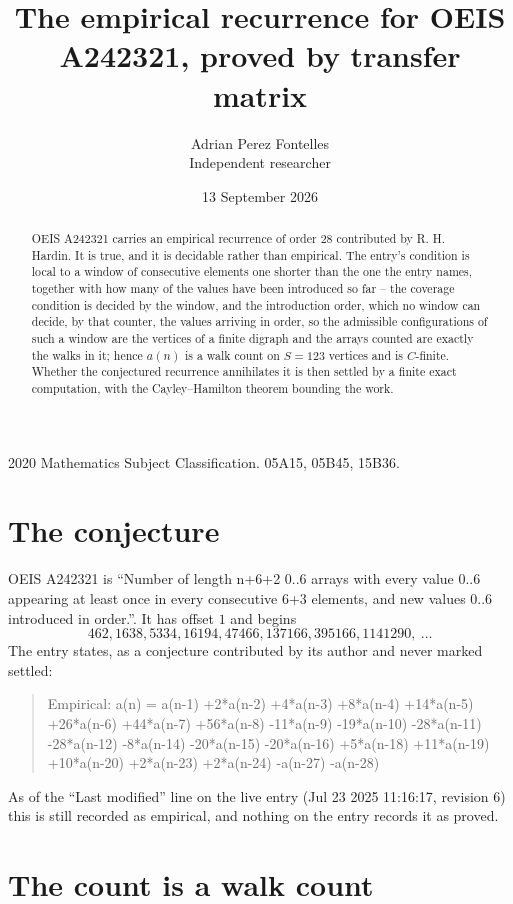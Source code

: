 \documentclass[11pt,a4paper]{article}
\title{The empirical recurrence for OEIS A242321, proved by transfer matrix}
\author{Adrian Perez Fontelles\\ \small Independent researcher}
\date{13 September 2026}
\theoremstyle{plain}
\theoremstyle{definition}
\begin{document}
\maketitle

\begin{abstract}
OEIS A242321 carries an empirical recurrence of order $28$ contributed by R. H. Hardin. It is
true, and it is decidable rather than empirical. The entry's condition is local to a window of consecutive elements one shorter than the one the entry names, together with how many of the values have been introduced so far -- the coverage condition is decided by the window, and the introduction order, which no window can decide, by that counter, the values arriving in order, so
the admissible configurations of such a window are the vertices of a finite digraph and the
arrays counted are exactly the walks in it; hence $a(n)$ is a walk count on $S=123$ vertices
and is $C$-finite. Whether the conjectured recurrence annihilates it is then settled by a
finite exact computation, with the Cayley--Hamilton theorem bounding the work.
\end{abstract}

\noindent\small 2020 Mathematics Subject Classification. 05A15, 05B45, 15B36.\normalsize

\section{The conjecture}

OEIS A242321 is ``Number of length n+6+2 0..6 arrays with every value 0..6 appearing at least once in every consecutive 6+3 elements, and new values 0..6 introduced in order.''. It has offset $1$ and begins
\[
462, 1638, 5334, 16194, 47466, 137166, 395166, 1141290,\ \dots
\]
The entry states, as a conjecture contributed by its author and never marked settled:
\begin{quote}
Empirical: a(n) = a(n-1) +2*a(n-2) +4*a(n-3) +8*a(n-4) +14*a(n-5) +26*a(n-6) +44*a(n-7) +56*a(n-8) -11*a(n-9) -19*a(n-10) -28*a(n-11) -28*a(n-12) -8*a(n-14) -20*a(n-15) -20*a(n-16) +5*a(n-18) +11*a(n-19) +10*a(n-20) +2*a(n-23) +2*a(n-24) -a(n-27) -a(n-28)
\end{quote}
As of the ``Last modified'' line on the live entry (Jul 23 2025 11:16:17, revision 6) this is still
recorded as empirical, and nothing on the entry records it as proved.

\section{The count is a walk count}
\end{document}
